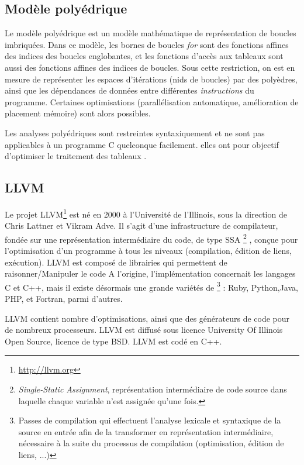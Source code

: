 \documentclass[a4paper,11pt]{article}
\begin{document}
\subsection{Modèle polyédrique}
\label{sec:poly} 
Le modèle polyédrique est un modèle mathématique de représentation de boucles imbriquées. 
Dans ce modèle, les bornes de boucles \emph{for} sont des fonctions affines des indices des boucles englobantes, et les fonctions d'accès aux tableaux sont aussi des fonctions affines des indices de boucles. 
Sous cette  restriction, on est en mesure de représenter les espaces d'itérations (nids de boucles) par des polyèdres, ainsi que les dépendances de données entre différentes \emph{instructions} du programme.
Certaines optimisations (parallélisation automatique, amélioration de placement mémoire) sont alors possibles.

Les analyses polyédriques sont restreintes syntaxiquement et ne sont pas applicables à un
programme C quelconque facilement. elles ont pour objectif d'optimiser le traitement des tableaux .

\subsection{LLVM}

\label{LLVM}
Le projet LLVM\footnote{\url{http://llvm.org}} est né en 2000 à l'Université de l'Illinois, sous la direction de Chris Lattner et Vikram Adve. 
Il s'agit d'une infrastructure de compilateur, fondée sur une représentation intermédiaire du code, de type SSA
\footnote{\textit{Single-Static Assignment}, représentation intermédiaire de code source dans laquelle chaque variable n'est assignée qu'une fois.}
, conçue pour l'optimisation d'un programme à tous les niveaux (compilation, édition de liens, exécution). 
LLVM est composé de librairies qui permettent de raisonner/Manipuler le code
A l'origine, l'implémentation concernait les langages C et C++, mais il existe désormais une grande variétés de  
\footnote{Passes de compilation qui effectuent l'analyse
lexicale et syntaxique de la source en entrée afin de la transformer en représentation intermédiaire, nécessaire à la suite du processus de compilation (optimisation, édition de liens, ...) } 
: Ruby, Python,Java, PHP, et Fortran, parmi d'autres.

LLVM contient nombre d'optimisations, ainsi que des générateurs de code pour de nombreux processeurs. LLVM est diffusé sous licence University Of Illinois Open Source, licence de type BSD. LLVM est codé en C++. 
\end{document}
